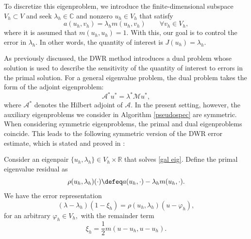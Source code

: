 To discretize this eigenproblem, we introduce the finite-dimensional subspace $V_h \subset V$ and seek $\lambda_h \in \mathbb{C}$ and nonzero $u_h \in V_h$ that satisfy
\begin{equation} \label{gal eig}
    a(u_h, v_h) = \lambda_h m(u_h, v_h) \qquad \forall v_h \in V_h,
\end{equation}
where it is assumed that $m(u_h, u_h) = 1.$
With this, our goal is to control the error in $\lambda_h$. In other words, the quantity of interest is $J(u_h) = \lambda_h.$


As previously discussed, the DWR method introduces a dual problem whose solution is used to describe the sensitivity of the quantity of interest to errors in the primal solution. For a general eigenvalue problem, the dual problem takes the form of the adjoint eigenproblem:
\begin{equation} \label{dual eig}
    \mathcal{A}^* u^* = \lambda^*\mathcal{M}u^*, 
\end{equation}
where $\mathcal{A}^*$ denotes the Hilbert adjoint of $\mathcal{A}$. In the present setting, however, the auxiliary eigenproblems we consider in Algorithm \ref{pseudospec} are symmetric. When considering symmetric eigenproblems, the primal and dual eigenproblems coincide. This leads to the following symmetric version of the DWR error estimate, which is stated and proved in \cite{Bangerth, Heuveline}:
\begin{corollary}
    Consider an eigenpair $\{u_h, \lambda_h\} \in V_h \times \mathbb{R}$ that solves \eqref{gal eig}. 
    Define the primal eigenvalue residual as
    \begin{equation} \label{resid}
        \rho(u_h, \lambda_h)(\cdot) \defeq a(u_h, \cdot) - \lambda_h m(u_h, \cdot).
    \end{equation}
    We have the error representation
    \begin{equation} \label{DWR}
        (\lambda - \lambda_h)(1 - \xi_h) = \rho(u_h, \lambda_h)(u - \varphi_h),
    \end{equation}
    for an arbitrary $\varphi_h \in V_h,$ with the remainder term
    \begin{equation}
        \xi_h = \frac{1}{2} m(u-u_h, u-u_h).
    \end{equation}

\end{corollary}


